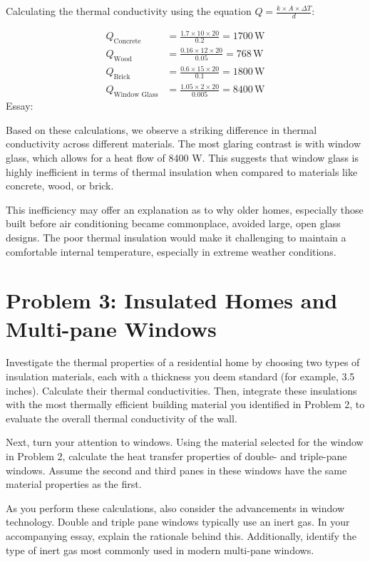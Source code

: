 \documentclass[12pt]{article}
\begin{document}
Calculating the thermal conductivity using the equation \(Q = \frac{k \times A \times \Delta T}{d}\):

\begin{align*}
Q_{\text{Concrete}} &= \frac{1.7 \times 10 \times 20}{0.2} = 1700 \, \text{W} \\
Q_{\text{Wood}} &= \frac{0.16 \times 12 \times 20}{0.05} = 768 \, \text{W} \\
Q_{\text{Brick}} &= \frac{0.6 \times 15 \times 20}{0.1} = 1800 \, \text{W} \\
Q_{\text{Window Glass}} &= \frac{1.05 \times 2 \times 20}{0.005} = 8400 \, \text{W}
\end{align*}
\newline
Essay:

Based on these calculations, we observe a striking difference in thermal conductivity across different materials. The most glaring contrast is with window glass, which allows for a heat flow of 8400 W. This suggests that window glass is highly inefficient in terms of thermal insulation when compared to materials like concrete, wood, or brick.

This inefficiency may offer an explanation as to why older homes, especially those built before air conditioning became commonplace, avoided large, open glass designs. The poor thermal insulation would make it challenging to maintain a comfortable internal temperature, especially in extreme weather conditions.


\newpage
\section*{Problem 3: Insulated Homes and Multi-pane Windows}
Investigate the thermal properties of a residential home by choosing two types of insulation materials, each with a thickness you deem standard (for example, 3.5 inches). Calculate their thermal conductivities. Then, integrate these insulations with the most thermally efficient building material you identified in Problem 2, to evaluate the overall thermal conductivity of the wall.
\newline

Next, turn your attention to windows. Using the material selected for the window in Problem 2, calculate the heat transfer properties of double- and triple-pane windows. Assume the second and third panes in these windows have the same material properties as the first.
\newline

As you perform these calculations, also consider the advancements in window technology. Double and triple pane windows typically use an inert gas. In your accompanying essay, explain the rationale behind this. Additionally, identify the type of inert gas most commonly used in modern multi-pane windows.
\newline
\end{document}
